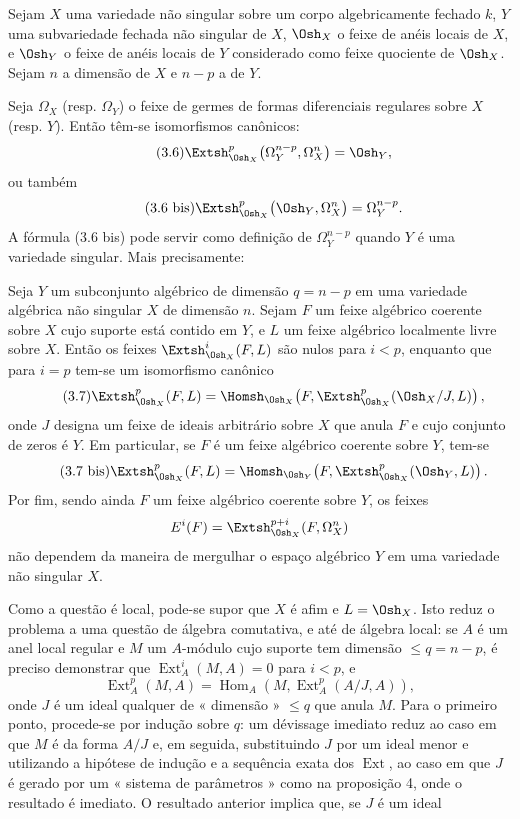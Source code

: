  Sejam $X$ uma variedade não singular sobre um corpo
algebricamente fechado $k$, $Y$ uma subvariedade fechada não singular de $X$,
$\Osh_X$ o feixe de anéis locais de $X$, e $\Osh_Y$ o feixe de anéis
locais de $Y$ considerado como feixe quociente de $\Osh_X$. Sejam $n$ a
dimensão de $X$ e $n-p$ a de $Y$.

Seja $\Omega_X$ (resp. $\Omega_Y$) o feixe de germes de formas
diferenciais regulares sobre $X$ (resp. $Y$). Então têm-se isomorfismos
canônicos:
\begin{equation}\tag{3.6}
  \Extsh_{\Osh_X}^{p}\bigl(\Omega_Y^{n-p},\Omega_X^{n}\bigr)=\Osh_Y,
\end{equation}
ou também
\begin{equation}\tag{3.6 bis}
  \Extsh_{\Osh_X}^{p}\bigl(\Osh_Y,\Omega_X^{n}\bigr)=\Omega_Y^{n-p}.
\end{equation}
A fórmula (3.6 bis) pode servir como definição de $\Omega_Y^{n-p}$ quando $Y$
é uma variedade singular. Mais precisamente:

 Seja $Y$ um subconjunto algébrico de dimensão
$q=n-p$ em uma variedade algébrica não singular $X$ de dimensão $n$. Sejam
$F$ um feixe algébrico coerente sobre $X$ cujo suporte está contido em $Y$, e $L$
um feixe algébrico localmente livre sobre $X$. Então os feixes
$\Extsh_{\Osh_X}^{i}(F,L)$ são nulos para $i<p$, enquanto que para $i=p$ tem-se um
isomorfismo canônico
\begin{equation}\tag{3.7}
  \Extsh_{\Osh_X}^{p}(F,L)
  =\Homsh_{\Osh_X}\!\left(F,
  \Extsh_{\Osh_X}^{p}(\Osh_X/J,L)\right),
\end{equation}
onde $J$ designa um feixe de ideais arbitrário sobre $X$ que anula $F$ e cujo
conjunto de zeros é $Y$. Em particular, se $F$ é um feixe algébrico
coerente sobre $Y$, tem-se
\begin{equation}\tag{3.7 bis}
  \Extsh_{\Osh_X}^{p}(F,L)
  =\Homsh_{\Osh_Y}\!\left(F,\Extsh_{\Osh_X}^{p}(\Osh_Y,L)\right).
\end{equation}
Por fim, sendo ainda $F$ um feixe algébrico coerente sobre $Y$, os feixes
\[
  E^{i}(F)=\Extsh_{\Osh_X}^{p+i}(F,\Omega_X^{n})
\]
não dependem da maneira de mergulhar o espaço algébrico $Y$ em uma variedade
não singular $X$.

Como a questão é local, pode-se supor que $X$ é afim e $L=\Osh_X$. Isto reduz
o problema a uma questão de álgebra comutativa, e até de álgebra local: se $A$ é um
anel local regular e $M$ um $A$-módulo cujo suporte tem dimensão
$\leq q=n-p$, é preciso demonstrar que $\operatorname{Ext}_{A}^{i}(M,A)=0$ para $i<p$, e
\[
  \operatorname{Ext}_{A}^{p}(M,A)
  =\operatorname{Hom}_{A}\!\left(M,\operatorname{Ext}_{A}^{p}(A/J,A)\right),
\]
onde $J$ é um ideal qualquer de « dimensão » $\leq q$ que anula $M$. Para o
primeiro ponto, procede-se por indução sobre $q$: um dévissage imediato reduz
ao caso em que $M$ é da forma $A/J$ e, em seguida, substituindo $J$ por um ideal menor
e utilizando a hipótese de indução e a sequência exata dos
$\operatorname{Ext}$, ao caso em que $J$ é gerado por um « sistema de parâmetros »
como na proposição 4, onde o resultado é imediato. O resultado
anterior implica que, se $J$ é um ideal

